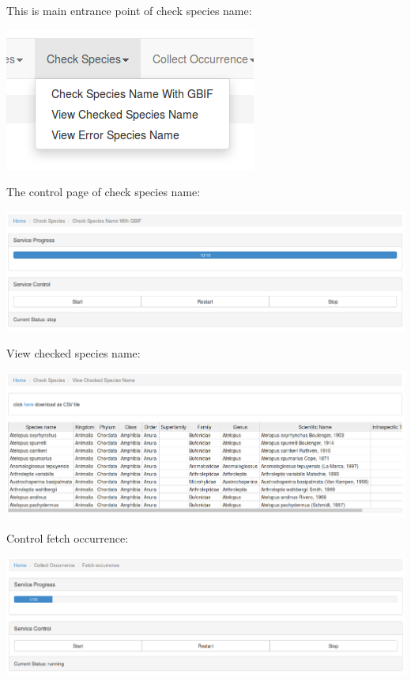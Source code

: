 \documentclass{beamer}
\begin{document}
\begin{frame}
	This is main entrance point of check species name:
	\begin{center}
		\includegraphics[scale=0.5]{image/check_species_all.png}
	\end{center}
\end{frame}
\begin{frame}
	The control page of check species name:
	\begin{center}
		\includegraphics[scale=0.2]{image/control_check_species.png}
	\end{center}
\end{frame}
\begin{frame}
	View checked species name:
	\begin{center}
		\includegraphics[scale=0.2]{image/checked_species_name.png}
	\end{center}
\end{frame}
\begin{frame}
	Control fetch occurrence:
	\begin{center}
		\includegraphics[scale=0.2]{image/control_collect_occurrence.png}
	\end{center}
\end{frame}
\end{document}
